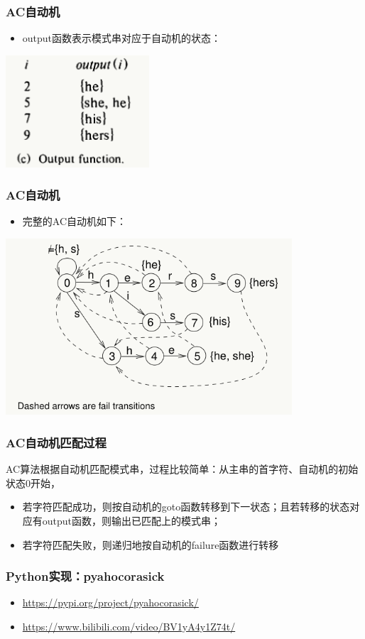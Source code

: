 \begin{frame}[fragile]
  \frametitle{AC自动机}
  \begin{itemize}
  \item output函数表示模式串对应于自动机的状态：
  \end{itemize}

  \begin{center}
  \includegraphics[width=0.4\textwidth]{figs/string/ac_output.png}
  \end{center}
\end{frame}

\begin{frame}[fragile]
  \frametitle{AC自动机}
  \begin{itemize}
  \item 完整的AC自动机如下：
  \end{itemize}

  \begin{center}
  \includegraphics[width=0.8\textwidth]{figs/string/ac.png}
  \end{center}
\end{frame}

\begin{frame}[fragile]
  \frametitle{AC自动机匹配过程}
  AC算法根据自动机匹配模式串，过程比较简单：从主串的首字符、自动机的初始状态0开始，

  \begin{itemize}
  \item 若字符匹配成功，则按自动机的goto函数转移到下一状态；且若转移的状态对应有output函数，则输出已匹配上的模式串；
  \item 若字符匹配失败，则递归地按自动机的failure函数进行转移
  \end{itemize}
\end{frame}


\begin{frame}[fragile]
  \frametitle{Python实现：pyahocorasick}
  \begin{itemize}
  \item \url{https://pypi.org/project/pyahocorasick/}
  \item \url{https://www.bilibili.com/video/BV1yA4y1Z74t/}
  \end{itemize}
\end{frame}